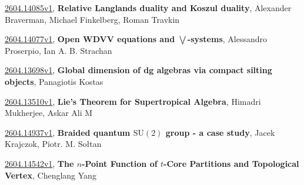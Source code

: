 \documentclass[9pt, a4paper]{article}
\theoremstyle{plain}
\theoremstyle{definition}
\theoremstyle{remark}
\newcommand{\arxiv}[3]{\href{https://arxiv.org/abs/#1}{#1}, \textbf{\textcolor{arxivblue}{#2}}, #3}
\begin{document}
\arxiv{2604.14085v1}{Relative Langlands duality and Koszul duality}{Alexander Braverman, Michael Finkelberg, Roman Travkin}

\arxiv{2604.14077v1}{Open WDVV equations and $\bigvee$-systems}{Alessandro Proserpio, Ian A. B. Strachan}

\arxiv{2604.13698v1}{Global dimension of dg algebras via compact silting objects}{Panagiotis Kostas}

\arxiv{2604.13510v1}{Lie's Theorem for Supertropical Algebra}{Himadri Mukherjee, Askar Ali M}

\arxiv{2604.14937v1}{Braided quantum $\mathrm{SU}(2)$ group - a case study}{Jacek Krajczok, Piotr. M. Sołtan}

\arxiv{2604.14542v1}{The $n$-Point Function of $t$-Core Partitions and Topological Vertex}{Chenglang Yang}

\end{document}
